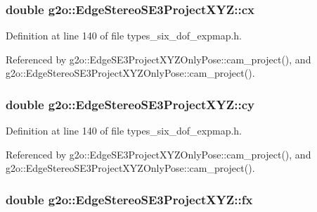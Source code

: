 \subsubsection[{\texorpdfstring{cx}{cx}}]{\setlength{\rightskip}{0pt plus 5cm}double g2o\+::\+Edge\+Stereo\+S\+E3\+Project\+X\+Y\+Z\+::cx}\hypertarget{classg2o_1_1EdgeStereoSE3ProjectXYZ_a0d786d2f349f8d4991be5303ad2b3c5d}{}\label{classg2o_1_1EdgeStereoSE3ProjectXYZ_a0d786d2f349f8d4991be5303ad2b3c5d}


Definition at line 140 of file types\+\_\+six\+\_\+dof\+\_\+expmap.\+h.



Referenced by g2o\+::\+Edge\+S\+E3\+Project\+X\+Y\+Z\+Only\+Pose\+::cam\+\_\+project(), and g2o\+::\+Edge\+Stereo\+S\+E3\+Project\+X\+Y\+Z\+Only\+Pose\+::cam\+\_\+project().

\subsubsection[{\texorpdfstring{cy}{cy}}]{\setlength{\rightskip}{0pt plus 5cm}double g2o\+::\+Edge\+Stereo\+S\+E3\+Project\+X\+Y\+Z\+::cy}\hypertarget{classg2o_1_1EdgeStereoSE3ProjectXYZ_a220dd625eb7479cc1dabb92a96a6664c}{}\label{classg2o_1_1EdgeStereoSE3ProjectXYZ_a220dd625eb7479cc1dabb92a96a6664c}


Definition at line 140 of file types\+\_\+six\+\_\+dof\+\_\+expmap.\+h.



Referenced by g2o\+::\+Edge\+S\+E3\+Project\+X\+Y\+Z\+Only\+Pose\+::cam\+\_\+project(), and g2o\+::\+Edge\+Stereo\+S\+E3\+Project\+X\+Y\+Z\+Only\+Pose\+::cam\+\_\+project().

\subsubsection[{\texorpdfstring{fx}{fx}}]{\setlength{\rightskip}{0pt plus 5cm}double g2o\+::\+Edge\+Stereo\+S\+E3\+Project\+X\+Y\+Z\+::fx}\hypertarget{classg2o_1_1EdgeStereoSE3ProjectXYZ_a4fe9f6810d2cc1b4489f84853445e85f}{}\label{classg2o_1_1EdgeStereoSE3ProjectXYZ_a4fe9f6810d2cc1b4489f84853445e85f}


